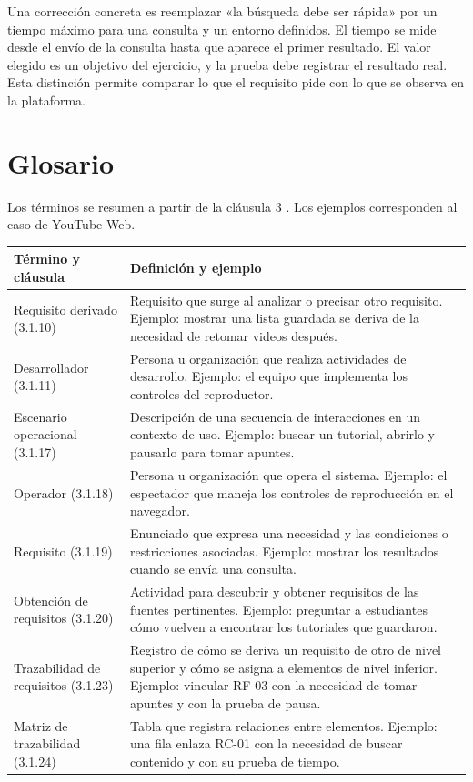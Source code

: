 \documentclass[11pt,a4paper]{article}
\begin{document}
Una corrección concreta es reemplazar «la búsqueda debe ser rápida»
por un tiempo máximo para una consulta y un entorno definidos. El tiempo
se mide desde el envío de la consulta hasta que aparece el primer
resultado. El valor elegido es un objetivo del ejercicio, y la prueba
debe registrar el resultado real. Esta distinción permite comparar lo
que el requisito pide con lo que se observa en la plataforma.

\section{Glosario}
Los términos se resumen a partir de la cláusula 3
\cite[cl. 3]{ieee29148}. Los ejemplos corresponden al caso de YouTube Web.

\begin{longtable}{@{}p{.26\linewidth}p{.70\linewidth}@{}}
\rowcolor{gray!15}\textbf{Término y cláusula} & \textbf{Definición y ejemplo} \\
\endhead
Requisito derivado (3.1.10) & Requisito que surge al analizar o precisar otro requisito. Ejemplo: mostrar una lista guardada se deriva de la necesidad de retomar videos después. \\
Desarrollador (3.1.11) & Persona u organización que realiza actividades de desarrollo. Ejemplo: el equipo que implementa los controles del reproductor. \\
Escenario operacional (3.1.17) & Descripción de una secuencia de interacciones en un contexto de uso. Ejemplo: buscar un tutorial, abrirlo y pausarlo para tomar apuntes. \\
Operador (3.1.18) & Persona u organización que opera el sistema. Ejemplo: el espectador que maneja los controles de reproducción en el navegador. \\
Requisito (3.1.19) & Enunciado que expresa una necesidad y las condiciones o restricciones asociadas. Ejemplo: mostrar los resultados cuando se envía una consulta. \\
Obtención de requisitos (3.1.20) & Actividad para descubrir y obtener requisitos de las fuentes pertinentes. Ejemplo: preguntar a estudiantes cómo vuelven a encontrar los tutoriales que guardaron. \\
Trazabilidad de requisitos (3.1.23) & Registro de cómo se deriva un requisito de otro de nivel superior y cómo se asigna a elementos de nivel inferior. Ejemplo: vincular RF-03 con la necesidad de tomar apuntes y con la prueba de pausa. \\
Matriz de trazabilidad (3.1.24) & Tabla que registra relaciones entre elementos. Ejemplo: una fila enlaza RC-01 con la necesidad de buscar contenido y con su prueba de tiempo. \\

\end{longtable}
\end{document}
